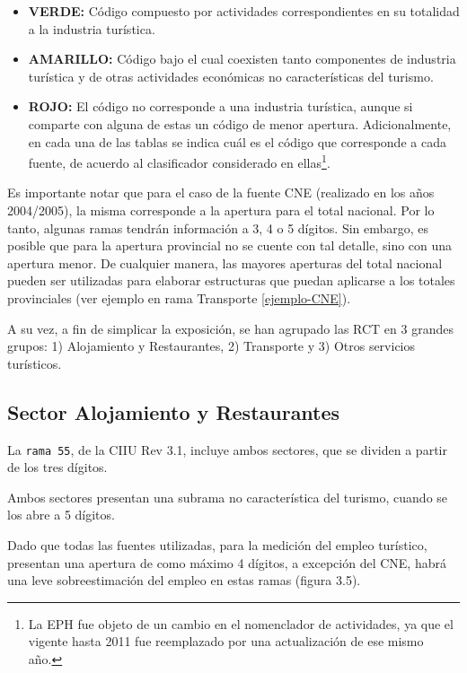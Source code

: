 \documentclass[
  openany]{book}
\providecommand{\tightlist}{%
  \setlength{\itemsep}{0pt}\setlength{\parskip}{0pt}}
\begin{document}
\begin{itemize}
\tightlist
\item
  {\textbf{VERDE:}} Código compuesto por actividades correspondientes en su totalidad a la industria turística.
\item
  {\textbf{AMARILLO:}} Código bajo el cual coexisten tanto componentes de industria turística y de otras actividades económicas no características del turismo.
\item
  {\textbf{ROJO:}} El código no corresponde a una industria turística, aunque si comparte con alguna de estas un código de menor apertura. Adicionalmente, en cada una de las tablas se indica cuál es el código que corresponde a cada fuente, de acuerdo al clasificador considerado en ellas\footnote{La EPH fue objeto de un cambio en el nomenclador de actividades, ya que el vigente hasta 2011 fue reemplazado por una actualización de ese mismo año.}.
\end{itemize}

Es importante notar que para el caso de la fuente CNE (realizado en los años 2004/2005), la misma corresponde a la apertura para el total nacional. Por lo tanto, algunas ramas tendrán información a 3, 4 o 5 dígitos. Sin embargo, es posible que para la apertura provincial no se cuente con tal detalle, sino con una apertura menor. De cualquier manera, las mayores aperturas del total nacional pueden ser utilizadas para elaborar estructuras que puedan aplicarse a los totales provinciales (ver ejemplo en rama Transporte \ref{ejemplo-CNE}).

A su vez, a fin de simplicar la exposición, se han agrupado las RCT en 3 grandes grupos: 1) Alojamiento y Restaurantes, 2) Transporte y 3) Otros servicios turísticos.

\hypertarget{sector-alojamiento-y-restaurantes}{%
\subsection{Sector Alojamiento y Restaurantes}\label{sector-alojamiento-y-restaurantes}}

La \texttt{rama\ 55}, de la CIIU Rev 3.1, incluye ambos sectores, que se dividen a partir de los tres dígitos.

Ambos sectores presentan una subrama no característica del turismo, cuando se los abre a 5 dígitos.

Dado que todas las fuentes utilizadas, para la medición del empleo turístico, presentan una apertura de como máximo 4 dígitos, a excepción del CNE, habrá una leve sobreestimación del empleo en estas ramas (figura 3.5).
\end{document}
